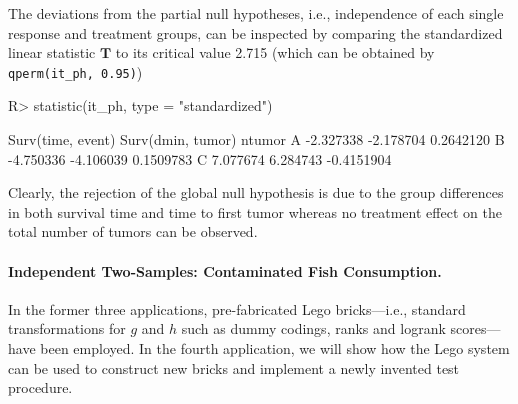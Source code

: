 \documentclass{article}
\newcommand{\T}{\mathbf{T}}
\newenvironment{Schunk}{}{}
\begin{document}
The deviations from the partial null hypotheses, i.e., independence of
each single response and treatment groups, can be inspected by comparing the standardized
linear statistic $\T$ to its critical value 2.715
(which can be obtained by \verb+qperm(it_ph, 0.95)+)
\begin{Schunk}
\begin{Sinput}
R> statistic(it_ph, type = "standardized")
\end{Sinput}
\begin{Soutput}
  Surv(time, event) Surv(dmin, tumor)     ntumor
A         -2.327338         -2.178704  0.2642120
B         -4.750336         -4.106039  0.1509783
C          7.077674          6.284743 -0.4151904
\end{Soutput}
\end{Schunk}
Clearly, the rejection of the global null hypothesis is due to the
group differences in both survival time and time to first tumor whereas 
no treatment effect on the total number of tumors can be observed.

\paragraph{Independent Two-Samples: Contaminated Fish Consumption.}

In the former three applications, pre-fabricated Lego bricks---i.e.,
standard transformations for $g$ and $h$ such as dummy codings, ranks
and logrank scores---have been employed.
In the fourth application, we will show how the Lego system can be used
to construct new bricks and implement a newly invented test procedure. 
\end{document}
